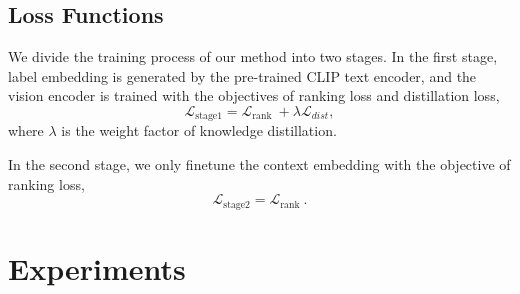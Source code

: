 \documentclass[letterpaper]{article} %
\begin{document}
\subsection{Loss Functions}
We divide the training process of our method into two stages. 
In the first stage, label embedding is generated by the pre-trained CLIP text encoder, and the vision encoder is trained with the objectives of ranking loss and distillation loss,
\begin{equation}
\mathcal{L}_{\text {stage1}} = \mathcal{L}_{\text {rank }} + \lambda \mathcal{L}_{dist},
\end{equation}
where $\lambda$ is the weight factor of knowledge distillation. \par
In the second stage, we only finetune the context embedding with the objective of ranking loss,
\begin{equation}
\mathcal{L}_{\text {stage2}} = \mathcal{L}_{\text {rank }}.
\end{equation}

\section{Experiments}
\end{document}
